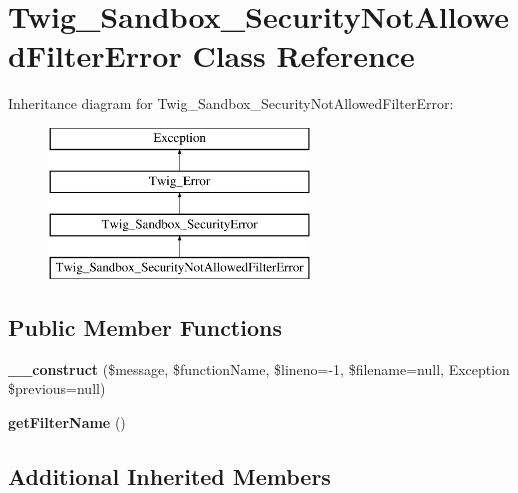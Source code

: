 \hypertarget{classTwig__Sandbox__SecurityNotAllowedFilterError}{}\section{Twig\+\_\+\+Sandbox\+\_\+\+Security\+Not\+Allowed\+Filter\+Error Class Reference}
\label{classTwig__Sandbox__SecurityNotAllowedFilterError}
Inheritance diagram for Twig\+\_\+\+Sandbox\+\_\+\+Security\+Not\+Allowed\+Filter\+Error\+:\begin{figure}[H]
\begin{center}
\leavevmode
\includegraphics[height=4.000000cm]{classTwig__Sandbox__SecurityNotAllowedFilterError}
\end{center}
\end{figure}
\subsection*{Public Member Functions}
\begin{DoxyCompactItemize}
\item 
{\bfseries \+\_\+\+\_\+construct} (\$message, \$function\+Name, \$lineno=-\/1, \$filename=null, Exception \$previous=null)\hypertarget{classTwig__Sandbox__SecurityNotAllowedFilterError_a91c3247e2b0c3ac342e71cd21d66892c}{}\label{classTwig__Sandbox__SecurityNotAllowedFilterError_a91c3247e2b0c3ac342e71cd21d66892c}

\item 
{\bfseries get\+Filter\+Name} ()\hypertarget{classTwig__Sandbox__SecurityNotAllowedFilterError_ac75f50f6676b1dd6a3102c4b01a73ac7}{}\label{classTwig__Sandbox__SecurityNotAllowedFilterError_ac75f50f6676b1dd6a3102c4b01a73ac7}

\end{DoxyCompactItemize}
\subsection*{Additional Inherited Members}


